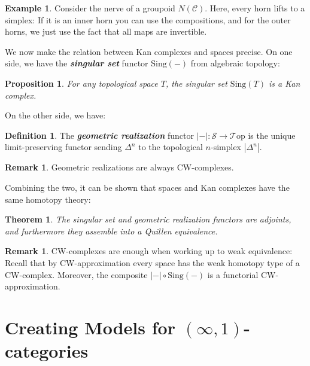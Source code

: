 \documentclass{article}
\newcommand{\textbi}[1]{\textbf{\textit{#1}}}
\newcommand{\C}{\mathscr{C}}
\newcommand{\cS}{\mathcal{S}}
\newcommand{\Top}{\mathscr{T}\mathrm{op}}
\newtheorem{prop}[subsection]{Proposition}
\newtheorem{thm}[subsection]{Theorem}
\theoremstyle{definition}
\newtheorem{defin}[subsection]{Definition}
\newtheorem{rem}[subsection]{Remark}
\newtheorem{ex}[subsection]{Example}
\begin{document}
\begin{ex}
    Consider the nerve of a groupoid $N(\C)$. Here, every horn lifts to a simplex: If it is an inner horn you can use the compositions, and for the outer horns, we just use the fact that all maps are invertible.
\end{ex}

We now make the relation between Kan complexes and spaces precise. On one side, we have the \textbi{singular set} functor $\text{Sing}(-)$ from algebraic topology:

\begin{prop}
    For any topological space $T$, the singular set $\text{Sing}(T)$ is a Kan complex.
\end{prop}

On the other side, we have:

\begin{defin}
    The \textbi{geometric realization} functor $|-|:\cS\to \Top$ is the unique limit-preserving functor sending $\Delta^n$ to the topological $n$-simplex $|\Delta^n|$.
\end{defin}

\begin{rem}
    Geometric realizations are always CW-complexes.
\end{rem}

Combining the two, it can be shown that spaces and Kan complexes have the same homotopy theory:

\begin{thm}
    The singular set and geometric realization functors are adjoints, and furthermore they assemble into a Quillen equivalence.
\end{thm}

\begin{rem}
    CW-complexes are enough when working up to weak equivalence: Recall that by CW-approximation every space has the weak homotopy type of a CW-complex. Moreover, the composite $|-|\circ \text{Sing}(-)$ is a functorial CW-approximation.
\end{rem}

\section{Creating Models for $(\infty,1)$-categories}
\end{document}
